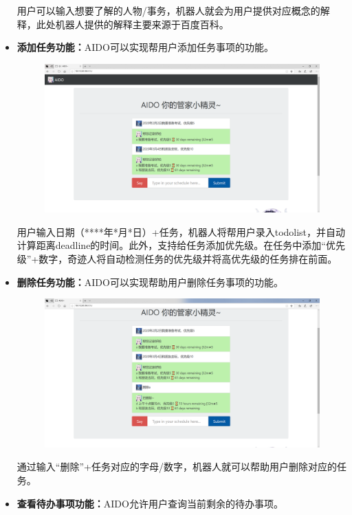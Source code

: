 \documentclass[a4paper, 11pt]{article}
\begin{document}
\begin{itemize}
\par 用户可以输入想要了解的人物/事务，机器人就会为用户提供对应概念的解释，此处机器人提供的解释主要来源于百度百科。
\item \textbf{添加任务功能：}AIDO可以实现帮用户添加任务事项的功能。
\begin{figure}[H]
\centering
\includegraphics[width=15cm]{fig/add_task}
\end{figure}
\par 用户输入日期（****年*月*日）+任务，机器人将帮用户录入todolist，并自动计算距离deadline的时间。此外，支持给任务添加优先级。在任务中添加“优先级”+数字，奇迹人将自动检测任务的优先级并将高优先级的任务排在前面。
\item \textbf{删除任务功能：}AIDO可以实现帮助用户删除任务事项的功能。
\begin{figure}[H]
\centering
\includegraphics[width=15cm]{fig/del_task}
\end{figure}
\par 通过输入“删除”+任务对应的字母/数字，机器人就可以帮助用户删除对应的任务。
\item \textbf{查看待办事项功能：}AIDO允许用户查询当前剩余的待办事项。
\begin{figure}[H]

\end{figure}
\end{itemize}
\end{document}

